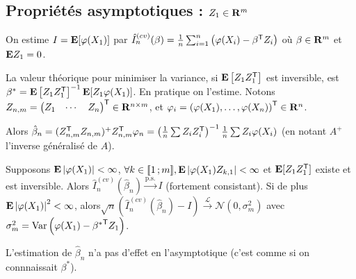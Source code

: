 


\subsection{Propriétés asymptotiques : $Z_1 \in \mathbf{R}^m$}

	On estime $I = \mathbf{E}[\varphi(X_1)]$ par $\hat{I}_n^{(cv)}(\beta) = \frac{1}{n} \sum_{i = 1}^n \left( \varphi(X_i) - \beta^\mathsf{T}Z_i \right)$ où $\beta \in \mathbf{R}^m$ et $\mathbf{E} Z_1 = 0$.

	La valeur théorique pour minimiser la variance, si $\mathbf{E} \left[ Z_1 Z_1^\mathsf{T} \right]$ est inversible, est\linebreak $\beta^* = \mathbf{E} \left[ Z_1 Z_1^\mathsf{T} \right]^{-1} \mathbf{E}[Z_1 \varphi(X_1)]$.
	En pratique on l'estime.
	Notons $Z_{n,m} = \begin{pmatrix} Z_1 & \cdots & Z_n \end{pmatrix}^\mathsf{T} \in \mathbf{R}^{n \times m}$, et $\mathbf{\varphi}_i = \left(\varphi(X_1), \ldots, \varphi(X_n) \right)^\mathsf{T} \in \mathbf{R}^n$.
	
	Alors $\hat{\beta}_n = (Z_{n,m}^\mathsf{T} Z_{n,m})^{+} Z_{n,m}^\mathsf{T} \varphi_n = \left( \frac{1}{n} \sum Z_i Z_i^\mathsf{T} \right)^{-1} \frac{1}{n} \sum Z_i \varphi(X_i)$ (en notant $A^+$ l'inverse généralisé de $A$).
	
	\begin{pop}
		Supposons $\mathbf{E} \left\lvert\varphi(X_1)\right\rvert < \infty$, $\forall k \in \mathopen{[\![}1\mathclose{}\mathpunct{};m\mathclose{]\!]}, \mathbf{E} \left\lvert\varphi(X_1) Z_{k,1}\right\rvert < \infty$ et $\mathbf{E}[Z_1 Z_1^\mathsf{T}]$ existe et est inversible.
		Alors $\hat{I}_n^{(cv)}(\hat{\beta}_n) \overset{\text{p.s.}}{\longrightarrow} I$ (fortement consistant).
		Si de plus $\mathbf{E} \left\lvert\varphi(X_1)\right\rvert^2 < \infty$, alors\linebreak $\sqrt{n} \left( \hat{I}_n^{(cv)}(\hat{\beta}_n) - I \right) \overset{\mathcal{L}}{\longrightarrow} \mathcal{N}(0,\sigma_m^2)$ avec $\sigma_m^2 = \operatorname{Var} \left( \varphi(X_1) - {\beta^*}^\mathsf{T} Z_1 \right)$.
	\end{pop}
	
	\begin{rem}
		L'estimation de $\hat{\beta}_n$ n'a pas d'effet en l'asymptotique (c'est comme si on connnaissait $\beta^*$).
	\end{rem}
	
